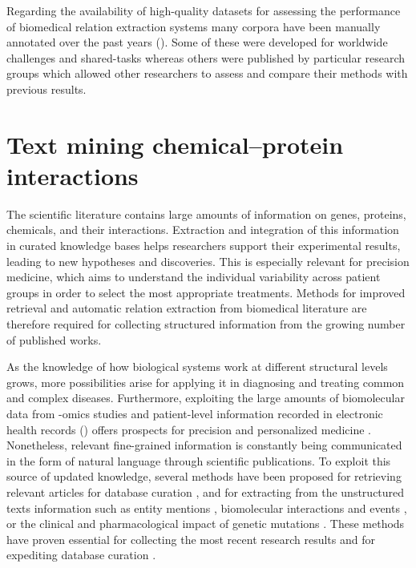 Regarding the availability of high-quality datasets for assessing the performance of biomedical relation extraction systems many corpora have been manually annotated over the past years ().
Some of these were developed for worldwide challenges and shared-tasks whereas others were published by particular research groups which allowed other researchers to assess and compare their methods with previous results.




\section{Text mining chemical--protein interactions}

The scientific literature contains large amounts of information on genes, proteins, chemicals, and their interactions.
Extraction and integration of this information in curated knowledge bases helps researchers support their experimental results, leading to new hypotheses and discoveries.
This is especially relevant for precision medicine, which aims to understand the individual variability across patient groups in order to select the most appropriate treatments.
Methods for improved retrieval and automatic relation extraction from biomedical literature are therefore required for collecting structured information from the growing number of published works.

As the knowledge of how biological systems work at different structural levels grows, more possibilities arise for applying it in diagnosing and treating common and complex diseases.
Furthermore, exploiting the large amounts of biomolecular data from -omics studies and patient-level information recorded in electronic health records () offers prospects for precision and personalized medicine \parencite{wu2017a}.
Nonetheless, relevant fine-grained information is constantly being communicated in the form of natural language through scientific publications.
To exploit this source of updated knowledge, several methods have been proposed for retrieving relevant articles for database curation \parencite{wang2016c}, and for extracting from the unstructured texts information such as entity mentions \parencite{campos2013b,nunes2013b}, biomolecular interactions and events \parencite{ananiadou2015a,krallinger2011a}, or the clinical and pharmacological impact of genetic mutations \parencite{singhal2016a}.
These methods have proven essential for collecting the most recent research results and for expediting database curation \parencite{krallinger2017b}.

